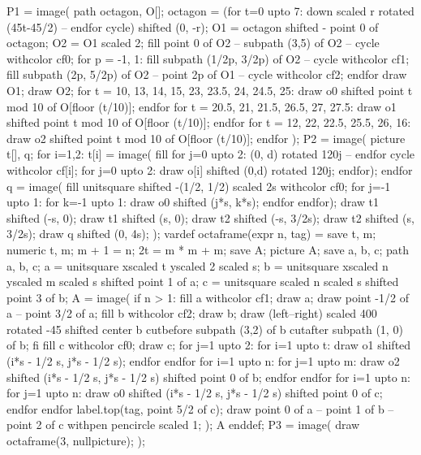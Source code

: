 \documentclass[oneside]{scrbook}
\begin{document}
P1 = image(
   path octagon, O[];
   octagon = (for t=0 upto 7: down scaled r rotated (45t-45/2) -- endfor cycle) shifted (0, -r);
   O1 = octagon shifted - point 0 of octagon;
   O2 = O1 scaled 2; 
   fill point 0 of O2 -- subpath (3,5) of O2 -- cycle withcolor cf0;
   for p = -1, 1:
       fill subpath (1/2p, 3/2p) of O2 -- cycle withcolor cf1;
       fill subpath (2p, 5/2p) of O2 -- point 2p of O1 -- cycle withcolor cf2;
   endfor
   draw O1; draw O2;
   for t = 10, 13, 14, 15, 23, 23.5, 24, 24.5, 25:
       draw o0 shifted point t mod 10 of O[floor (t/10)];
   endfor
   for t = 20.5, 21, 21.5, 26.5, 27, 27.5:
       draw o1 shifted point t mod 10 of O[floor (t/10)];
   endfor
   for t = 12, 22, 22.5, 25.5, 26, 16:
       draw o2 shifted point t mod 10 of O[floor (t/10)];
   endfor
);
P2 = image(
   picture t[], q;
   for i=1,2:
       t[i] = image(
           fill for j=0 upto 2: (0, d) rotated 120j -- endfor cycle withcolor cf[i];
           for j=0 upto 2: draw o[i] shifted (0,d) rotated 120j; endfor);
   endfor
   q = image(
       fill unitsquare shifted -(1/2, 1/2) scaled 2s withcolor cf0;
       for j=-1 upto 1: for k=-1 upto 1: draw o0 shifted (j*s, k*s); endfor endfor);
   draw t1 shifted (-s, 0); draw t1 shifted (s, 0); 
   draw t2 shifted (-s, 3/2s); draw t2 shifted (s, 3/2s);
   draw q shifted (0, 4s);
);
vardef octaframe(expr n, tag) = 
   save t, m; numeric t, m;
   m + 1 = n; 2t = m * m + m;
   save A; picture A; 
   save a, b, c; path a, b, c;
   a = unitsquare xscaled t yscaled 2 scaled s;
   b = unitsquare xscaled n yscaled m scaled s shifted point 1 of a;
   c = unitsquare scaled n scaled s shifted point 3 of b; 
   A = image(
       if n > 1:
           fill a withcolor cf1; draw a; draw point -1/2 of a -- point 3/2 of a;
           fill b withcolor cf2; draw b; 
           draw (left--right) scaled 400 rotated -45 shifted center b 
               cutbefore subpath (3,2) of b cutafter subpath (1, 0) of b;
       fi
       fill c withcolor cf0; draw c;
       for j=1 upto 2:
           for i=1 upto t:
               draw o1 shifted (i*s - 1/2 s, j*s - 1/2 s);
           endfor
       endfor
       for i=1 upto n:
           for j=1 upto m:
               draw o2 shifted (i*s - 1/2 s, j*s - 1/2 s) shifted point 0 of b;
           endfor
       endfor
       for i=1 upto n:
           for j=1 upto n:
               draw o0 shifted (i*s - 1/2 s, j*s - 1/2 s) shifted point 0 of c;
           endfor
       endfor
       label.top(tag, point 5/2 of c);
       draw point 0 of a -- point 1 of b -- point 2 of c withpen pencircle scaled 1;
   ); A enddef;
P3 = image(
   draw octaframe(3, nullpicture);
);
\end{document}
